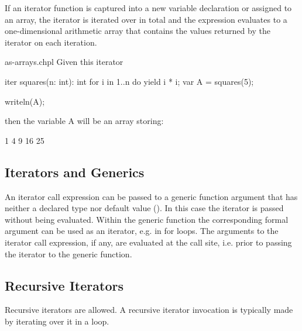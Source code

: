 If an iterator function is captured into a new variable declaration or
assigned to an array, the iterator is iterated over in total and the
expression evaluates to a one-dimensional arithmetic array that
contains the values returned by the iterator on each iteration.
\begin{chapelexample}{as-arrays.chpl}
Given this iterator
\begin{chapel}
iter squares(n: int): int {
  for i in 1..n do
    yield i * i;
}
var A = squares(5);
\end{chapel}
\begin{chapelpost}
writeln(A);
\end{chapelpost}
then the variable A will be an array storing:
\begin{chapelprintoutput}{}
1 4 9 16 25
\end{chapelprintoutput}
\end{chapelexample}

\subsection{Iterators and Generics}
\label{Iterators_and_Generics}

An iterator call expression can be passed to a generic function argument that
has neither a declared type nor default value
().
In this case the iterator is passed without being evaluated.
Within the generic function the corresponding formal argument
can be used as an iterator, e.g. in for loops.
The arguments to the iterator call expression, if any, are evaluated
at the call site, i.e. prior to passing the iterator to the generic function.

\subsection{Recursive Iterators}
\label{Recursive_Iterators}

Recursive iterators are allowed. A recursive iterator invocation is
typically made by iterating over it in a loop.


